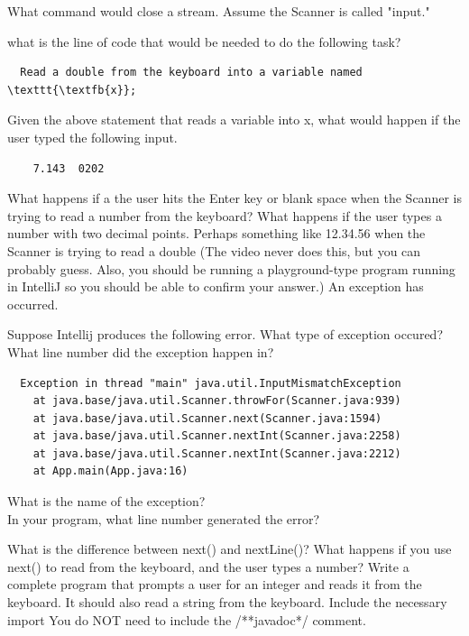 \documentclass[letterpaper,11pt]{exam}
\begin{document}
\begin{questions}
\question What command would close a stream.  Assume the Scanner is called "input."
\begin{samepage}
\question what is the line of code that would be needed to do the following task?
\begin{verbatim}
  Read a double from the keyboard into a variable named \texttt{\textfb{x}};
\end{verbatim}
\end{samepage}
\begin{samepage}
\question Given the above statement that reads a variable into x, what would happen if the user typed the following input.  
\begin{verbatim}
    7.143  0202
\end{verbatim}
\end{samepage}
\question What happens if a the user hits the Enter key or blank space when the Scanner is trying to read a number from the keyboard?
\question What happens if the user types a number with two decimal points.  Perhaps something like 12.34.56 when the Scanner is trying to read a double (The video never does this, but you can probably guess.  Also, you should be running a playground-type program running in IntelliJ so you should be able to confirm your answer.)
\question An exception has occurred.  
\begin{samepage}
\question Suppose Intellij produces the following error.  What type of exception occured?  What line number did the exception happen in?
\begin{verbatim}
  Exception in thread "main" java.util.InputMismatchException
	at java.base/java.util.Scanner.throwFor(Scanner.java:939)
	at java.base/java.util.Scanner.next(Scanner.java:1594)
	at java.base/java.util.Scanner.nextInt(Scanner.java:2258)
	at java.base/java.util.Scanner.nextInt(Scanner.java:2212)
	at App.main(App.java:16)
\end{verbatim}
  What is the name of the exception?\\
  In your program, what line number generated the error?
\end{samepage}
\question What is the difference between next() and nextLine()?
\vspace{1cm}
\question What happens if you use next() to read from the keyboard, and the user types a number?
\question Write a complete program that prompts a user for an integer and reads it from the keyboard.  It should also read a string from the keyboard. Include the necessary import  You do NOT need to include the /**javadoc*/ comment.
\vspace{2in}


\end{questions}
\end{document}
